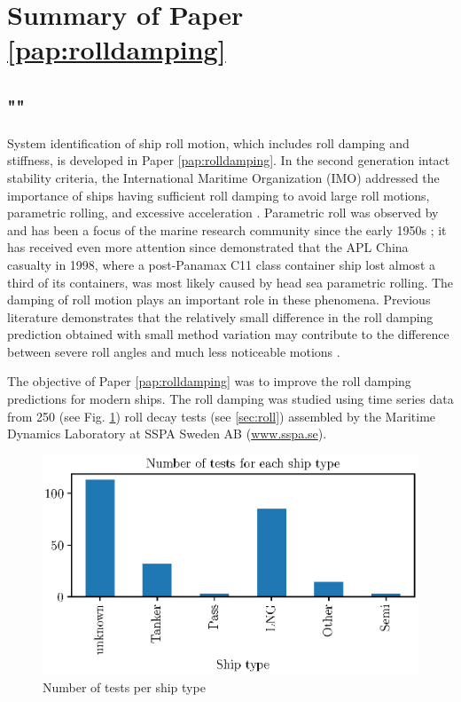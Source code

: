\section{Summary of Paper \ref{pap:rolldamping}}
\subsection*{""}
System identification of ship roll motion, which includes roll damping and stiffness, is developed in Paper \ref{pap:rolldamping}. In the second generation intact stability criteria, the International Maritime Organization (IMO) addressed the importance of ships having sufficient roll damping to avoid large roll motions, parametric rolling, and excessive acceleration \parencite{imo_finalization_2016}. Parametric roll was observed by \parencite{froude_rolling_1861} and has been a focus of the marine research community since the early 1950s \parencite{galeazzi_early_2013}; it has received even more attention since \parencite{france_investigation_2001} demonstrated that the APL China casualty in 1998, where a post-Panamax C11 class container ship lost almost a third of its containers, was most likely caused by head sea parametric rolling. The damping of roll motion plays an important role in these phenomena. Previous literature demonstrates that the relatively small difference in the roll damping prediction obtained with small method variation may contribute to the difference between severe roll angles and much less noticeable motions \parencite{soder_ikeda_2019}.

The objective of Paper \ref{pap:rolldamping} was to improve the roll damping predictions for modern ships. The roll damping was studied using time series data from 250 (see Fig. \ref{fig:ship_types}) roll decay tests (see \autoref{sec:roll}) assembled by the Maritime Dynamics Laboratory at SSPA Sweden AB (\href{www.sspa.se}{www.sspa.se}).

\begin{figure}[!htb]
    \centering
    \includegraphics[width=0.5\columnwidth]{kappa/images/ship_types.eps}
    \caption{Number of tests per ship type}
    \label{fig:ship_types}
\end{figure}

